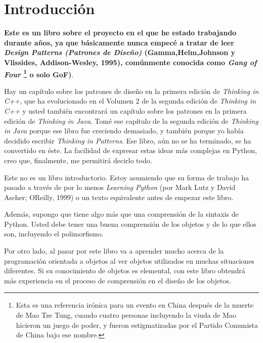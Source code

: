 \section*{Introducción}
\label{sec:intro}

\textbf{Este es un libro sobre el proyecto en el que he estado trabajando durante años, ya que básicamente nunca empecé a tratar de leer \textit{Design Patterns (Patrones de Diseño) }  (Gamma,Helm,Johnson y Vlissides, Addison-Wesley, 1995), comúnmente conocida como \textit{Gang of Four} \footnote{Esta es una referencia irónica para un evento en China después de la muerte de Mao Tze Tung, cuando cuatro personas incluyendo la viuda de Mao hicieron un juego de poder, y fueron estigmatizadas por el Partido Comunista de China bajo ese nombre.} o solo GoF)}.  \newline

Hay un capítulo sobre los patrones de diseño en la primera edición de \textit{Thinking in C++}, que ha evolucionado en el Volumen 2 de la segunda edición de \textit{Thinking in C++} y usted también encontrará un capítulo sobre los patrones en la primera edición de \textit{Thinking in Java}. Tomé ese capítulo de la segunda edición de \textit{Thinking in Java} porque ese libro fue creciendo demasiado, y también porque yo había decidido escribir \textit{Thinking in Patterns}. Ese libro, aún no se ha terminado, se ha convertido en éste. La facilidad de expresar estas ideas más complejas en Python, creo que, finalmente, me permitirá decirlo todo. \newline

Este no es un libro introductorio. Estoy asumiendo que su forma de trabajo ha pasado a través de por lo menos \textit{Learning Python} (por Mark Lutz y David Ascher; OReilly, 1999) o un texto equivalente antes de empezar este libro. \newline

Además, supongo que tiene algo más que una comprensión de la sintaxis de Python. Usted debe tener una buena comprensión de los objetos y de lo que ellos son, incluyendo el polimorfismo. \newline

Por otro lado, al pasar por este libro va a aprender mucho acerca de la programación orientada a objetos al ver objetos utilizados en muchas situaciones diferentes. Si su conocimiento de objetos es elemental, con este libro obtendrá más experiencia en el proceso de comprensión en el diseño de los objetos.


